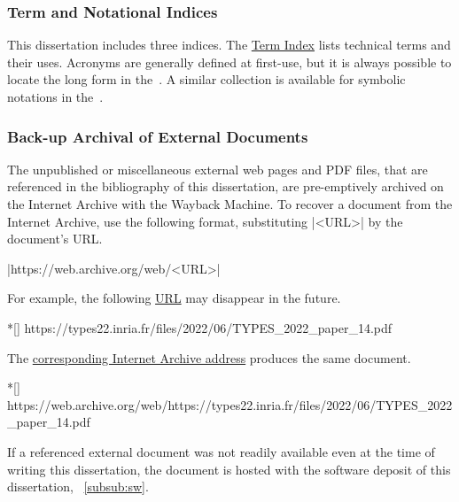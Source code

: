 \subsubsection{Term and Notational Indices}

This dissertation includes three indices.
The \hyperref[sec:app:index]{Term Index} lists technical terms and their uses.
Acronyms are generally defined at first-use, but it is always possible to locate the long form in the~\nameref{\acronymtype}.
A similar collection is available for symbolic notations in the~.

\subsubsection{Back-up Archival of External Documents}

The unpublished or miscellaneous external web pages and PDF files, that are referenced in the bibliography of this dissertation,
are pre-emptively archived on the Internet Archive with the Wayback Machine.
To recover a document from the Internet Archive, use the following format, substituting \pr|<URL>| by the document's URL\@.

\begin{center}
\pr|https://web.archive.org/web/<URL>|
\end{center}

For example, the following \href{https://types22.inria.fr/files/2022/06/TYPES_2022_paper_14.pdf}{URL} may disappear in the future.

\begin{center}
\begin{minipage}{\textwidth}
\begin{cmdlisting}*[]
https://types22.inria.fr/files/2022/06/TYPES_2022_paper_14.pdf
\end{cmdlisting}
\end{minipage}
\end{center}

The \href{https://web.archive.org/web/https://types22.inria.fr/files/2022/06/TYPES_2022_paper_14.pdf}{corresponding Internet Archive address} produces the same document.

\begin{center}
\begin{minipage}{\textwidth}
\begin{cmdlisting}*[]
https://web.archive.org/web/https://types22.inria.fr/files/2022/06/TYPES_2022_paper_14.pdf
\end{cmdlisting}
\end{minipage}
\end{center}

If a referenced external document was not readily available even at the time of writing this dissertation,
the document is hosted with the software deposit of this dissertation, \cf~\autoref{subsub:sw}.
